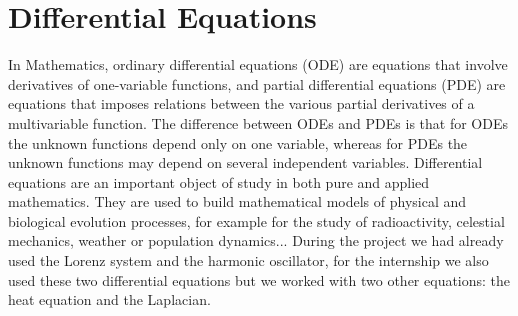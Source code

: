 \documentclass[12pt]{article}
\begin{document}
	\section{Differential Equations}
	\noindent In Mathematics, ordinary differential equations (ODE) are equations that involve derivatives of one-variable functions, and partial differential equations (PDE) are equations that imposes relations between the various partial derivatives of a multivariable function.
	The difference between ODEs and PDEs is that for ODEs the unknown functions depend only on one variable, whereas for PDEs the unknown functions may depend on several independent variables.
	\noindent Differential equations are an important object of study in both pure and applied mathematics. They are used to build mathematical models of physical and biological evolution processes, for example for the study of radioactivity, celestial mechanics, weather or population dynamics... 
	\noindent During the project we had already used the Lorenz system and the harmonic oscillator, for the internship we also used these two differential equations but we worked with two other equations: the heat equation and the Laplacian.
\end{document}
